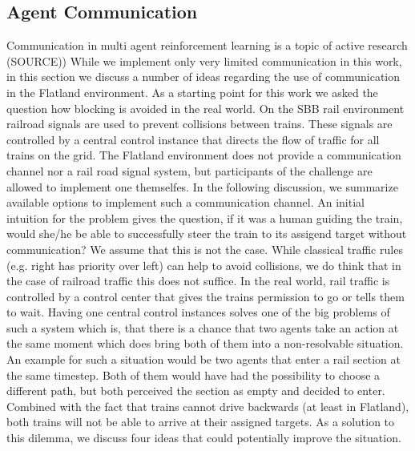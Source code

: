 \subsection*{Agent Communication}\label{agent_communication}
Communication in multi agent reinforcement learning is a topic of active research (SOURCE)) While we implement only very limited communication in this work, in this section we discuss a number of ideas regarding the use of communication in the Flatland environment. As a starting point for this work we asked the question how blocking is avoided in the real world. On the SBB rail environment railroad signals are used to prevent collisions between trains. These signals are controlled by a central control instance that directs the flow of traffic for all trains on the grid.
The Flatland environment does not provide a communication channel nor a rail road signal system, but participants of the challenge are allowed to implement one themselfes. In the following discussion, we summarize available options to implement such a communication channel. An initial intuition for the problem gives the question, if it was a human guiding the train, would she/he be able to successfully steer the train to its assigend target without communication?
We assume that this is not the case. While classical traffic rules (e.g. right has priority over left) can help to avoid collisions, we do think that in the case of railroad traffic this does not suffice. In the real world, rail traffic is controlled by a control center that gives the trains permission to go or tells them to wait. Having one central control instances solves one of the big problems of such a system which is, that there is a chance that two agents take an action at the same moment which does bring both of them into a non-resolvable situation. An example for such a situation would be two agents that enter a rail section at the same timestep. Both of them would have had the possibility to choose a different path, but both perceived the section as empty and decided to enter. Combined with the fact that trains cannot drive backwards (at least in Flatland), both trains will not be able to arrive at their assigned targets. As a solution to this dilemma, we discuss four ideas that could potentially improve the situation.
